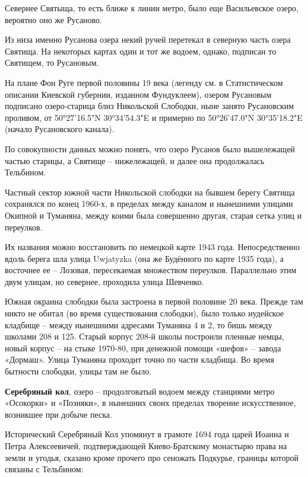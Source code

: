 Севернее Святыща, то есть ближе к линии метро, было еще Васильевское озеро, вероятно оно же Русаново.

Из низа именно Русанова озера некий ручей перетекал в северную часть озера Святища. На некоторых картах один и тот же водоем, однако, подписан то Святищем, то Русановым.

На плане Фон Руге первой половины 19 века (легенду см. в Статистическом описании Киевской губернии, изданном Фундуклеем), озером Русановым подписано озеро-старица близ Никольской Слободки, ныне занято Русановским проливом, от 50°27'16.5"N 30°34'54.3"E и примерно по 50°26'47.0"N 30°35'18.2"E (начало Русановского канала). 

По совокупности данных можно понять, что озеро Русанов было вышележащей частью старицы, а Святище – нижележащей, и далее она продолжалась Тельбином.

Частный сектор южной части Никольской слободки на бывшем берегу Святища сохранялся по конец 1960-х, в пределах между каналом и нынешними улицами Окипной и Туманяна, между коими была совершенно другая, старая сетка улиц и переулков.

Их названия можно восстановить по немецкой карте 1943 года. Непосредственно вдоль берега шла улица Uwjatyzka (она же Будённого по карте 1935 года), а восточнее ее – Лозовая, пересекаемая множеством переулков. Параллельно этим двум улицам, но севернее, проходила улица Шевченко.

Южная окраина слободки была застроена в первой половине 20 века. Прежде там никто не обитал (во время существования слободки), было только иудейское кладбище – между нынешними адресами Туманяна 4 и 2, то бишь между школами 208 и 125. Старый корпус 208-й школы построили пленные немцы, новый корпус – на стыке 1970-80, при денежной помощи «шефов» – завода «Дормаш». Улица Туманяна проходит точно по части кладбища. Во время бытности слободки, улицы там не было.\\

\medskip

\textbf{Серебряный кол}, озеро – продолговатый водоем между станциями метро «Осокорки» и «Позняки», в нынешних своих пределах творение искусственное, возникшее при добыче песка.

Исторический Серебряный Кол упомянут в грамоте 1694 года царей Иоанна и Петра Алексеевичей, подтверждающей Киево-Братскому монастырю права на земли и угодья, сказано кроме прочего про сеножать Подкурье, границы которой связаны с Тельбином:

